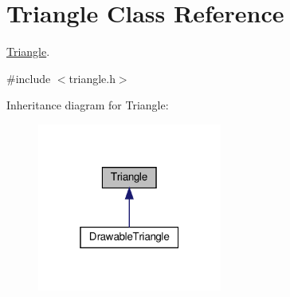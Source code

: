 \hypertarget{classTriangle}{}\section{Triangle Class Reference}
\label{classTriangle}


\hyperlink{classTriangle}{Triangle}.  




{\ttfamily \#include $<$triangle.\+h$>$}



Inheritance diagram for Triangle\+:
\nopagebreak
\begin{figure}[H]
\begin{center}
\leavevmode
\includegraphics[width=172pt]{classTriangle__inherit__graph}
\end{center}
\end{figure}
